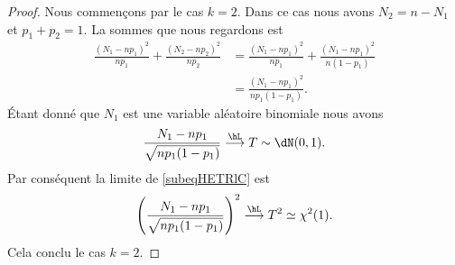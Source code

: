\begin{proof}
    Nous commençons par le cas \( k=2\). Dans ce cas nous avons \( N_2=n-N_1\) et \( p_1+p_2=1\). La sommes que nous regardons est
    \begin{subequations}
        \begin{align}
            \frac{ (N_1-np_1)^2 }{ np_1 }+\frac{ (N_2-np_2)^2 }{ np_2 }&=\frac{ (N_1-np_1)^2 }{ np_1 }+\frac{ (N_1-np_1)^2 }{ n(1-p_1) }\\
            &=\frac{ (N_1-np_1)^2 }{ np_1(1-p_1) }. \label{subeqHETRlC}
        \end{align}
    \end{subequations}
    Étant donné que \( N_1\) est une variable aléatoire binomiale nous avons
    \begin{equation}
        \frac{ N_1-np_1 }{ \sqrt{np_1(1-p_1)} }\stackrel{\hL}{\longrightarrow}T\sim\dN(0,1).
    \end{equation}
    Par conséquent la limite de \eqref{subeqHETRlC} est 
    \begin{equation}
        \left( \frac{ N_1-np_1 }{ \sqrt{np_1(1-p_1)} } \right)^2\stackrel{\hL}{\longrightarrow}T^2\simeq\chi^2(1).
    \end{equation}
    Cela conclu le cas \( k=2\).
    

\end{proof}
